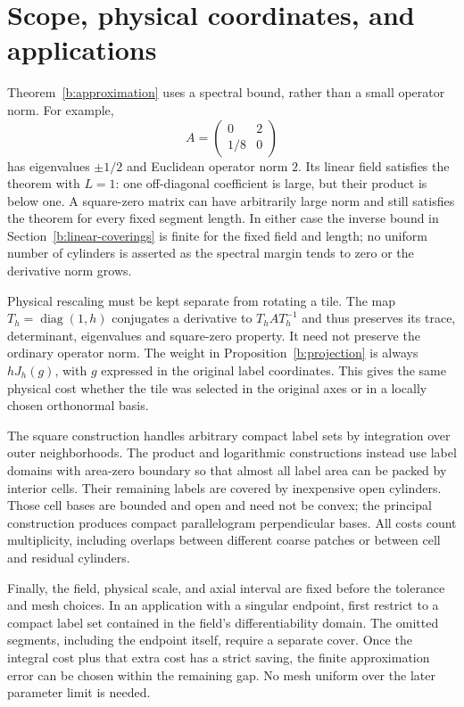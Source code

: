 \section{Scope, physical coordinates, and applications}\label{b:comparison}
Theorem~\ref{b:approximation} uses a spectral bound, rather than a
small operator norm. For example,
\[
 A=\begin{pmatrix}0&2\\1/8&0\end{pmatrix}
\]
has eigenvalues $\pm1/2$ and Euclidean operator norm $2$.
Its linear field satisfies the theorem with $L=1$: one off-diagonal
coefficient is large, but their product is below one. A square-zero
matrix can have arbitrarily large norm and still satisfies the theorem
for every fixed segment length. In either case the inverse bound in
Section~\ref{b:linear-coverings} is finite for the fixed field and length;
no uniform number of cylinders is asserted as the spectral margin tends
to zero or the derivative norm grows.

Physical rescaling must be kept separate from rotating a tile.
The map $T_h=\operatorname{diag}(1,h)$ conjugates a derivative to
$T_hAT_h^{-1}$ and thus preserves its trace, determinant, eigenvalues
and square-zero property. It need not preserve the ordinary operator
norm. The weight in Proposition~\ref{b:projection} is always $hJ_h(g)$,
with $g$ expressed in the original label coordinates. This gives the
same physical cost whether the tile was selected in the original axes
or in a locally chosen orthonormal basis.

The square construction handles arbitrary compact label sets by
integration over outer neighborhoods. The product and logarithmic
constructions instead use label domains with area-zero boundary so that
almost all label area can be packed by interior cells. Their remaining
labels are covered by inexpensive open cylinders. Those cell bases are
bounded and open and need not be convex; the principal construction
produces compact parallelogram perpendicular bases. All costs count
multiplicity, including overlaps between different coarse patches or
between cell and residual cylinders.

Finally, the field, physical scale, and axial interval are fixed before
the tolerance and mesh choices. In an application with a singular
endpoint, first restrict to a compact label set contained in the field's
differentiability domain. The omitted segments, including the endpoint
itself, require a separate cover. Once the integral cost plus that extra
cost has a strict saving, the finite approximation error can be chosen
within the remaining gap. No mesh uniform over the later parameter limit
is needed.
